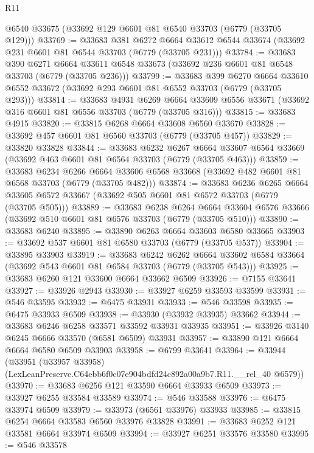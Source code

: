\begin{lexlean}{R11}
\begin{coremodule}
    @6540
    @33675
    (@33692 @129 @6601 @81 @6540 @33703 (@6779 (@33705 @129)))
@33769 := @33683
    @381
    @6272
    @6664
    @33612
    @6544
    @33674
    (@33692 @231 @6601 @81 @6544 @33703 (@6779 (@33705 @231)))
@33784 := @33683
    @390
    @6271
    @6664
    @33611
    @6548
    @33673
    (@33692 @236 @6601 @81 @6548 @33703 (@6779 (@33705 @236)))
@33799 := @33683
    @399
    @6270
    @6664
    @33610
    @6552
    @33672
    (@33692 @293 @6601 @81 @6552 @33703 (@6779 (@33705 @293)))
@33814 := @33683
    @4931
    @6269
    @6664
    @33609
    @6556
    @33671
    (@33692 @316 @6601 @81 @6556 @33703 (@6779 (@33705 @316)))
@33815 := @33683 @4915
@33820 := @33815 @6268 @6664 @33608 @6560 @33670
@33828 := @33692 @457 @6601 @81 @6560 @33703 (@6779 (@33705 @457))
@33829 := @33820 @33828
@33844 := @33683
    @6232
    @6267
    @6664
    @33607
    @6564
    @33669
    (@33692 @463 @6601 @81 @6564 @33703 (@6779 (@33705 @463)))
@33859 := @33683
    @6234
    @6266
    @6664
    @33606
    @6568
    @33668
    (@33692 @482 @6601 @81 @6568 @33703 (@6779 (@33705 @482)))
@33874 := @33683
    @6236
    @6265
    @6664
    @33605
    @6572
    @33667
    (@33692 @505 @6601 @81 @6572 @33703 (@6779 (@33705 @505)))
@33889 := @33683
    @6238
    @6264
    @6664
    @33604
    @6576
    @33666
    (@33692 @510 @6601 @81 @6576 @33703 (@6779 (@33705 @510)))
@33890 := @33683 @6240
@33895 := @33890 @6263 @6664 @33603 @6580 @33665
@33903 := @33692 @537 @6601 @81 @6580 @33703 (@6779 (@33705 @537))
@33904 := @33895 @33903
@33919 := @33683
    @6242
    @6262
    @6664
    @33602
    @6584
    @33664
    (@33692 @543 @6601 @81 @6584 @33703 (@6779 (@33705 @543)))
@33925 := @33683 @6260 @121 @33600 @6664 @33662 @6509
@33926 := @7155 @33641
@33927 := @33926 @2943
@33930 := @33927 @6259 @33593 @33599
@33931 := @546 @33595
@33932 := @6475 @33931
@33933 := @546 @33598
@33935 := @6475 @33933 @6509
@33938 := @33930 (@33932 @33935) @33662
@33944 := @33683 @6246 @6258 @33571 @33592 @33931 @33935
@33951 := @33926 @3140 @6245 @6666 @33570 (@6581 @6509) @33931
@33957 := @33890 @121 @6664 @6664 @6580 @6509 @33903
@33958 := @6799 @33641
@33964 := @33944
    (@33951 (@33957 @33958) (LexLeanPreserve.C64ebb6f0c07e904bdfd24c892a00a9b7.R11.__rel_40 @6579))
@33970 := @33683 @6256 @121 @33590 @6664 @33933 @6509
@33973 := @33927 @6255 @33584 @33589
@33974 := @546 @33588
@33976 := @6475 @33974 @6509
@33979 := @33973 (@6561 @33976) @33933
@33985 := @33815 @6254 @6664 @33583 @6560 @33976 @33828
@33991 := @33683 @6252 @121 @33581 @6664 @33974 @6509
@33994 := @33927 @6251 @33576 @33580
@33995 := @546 @33578

\end{coremodule}
\end{lexlean}
